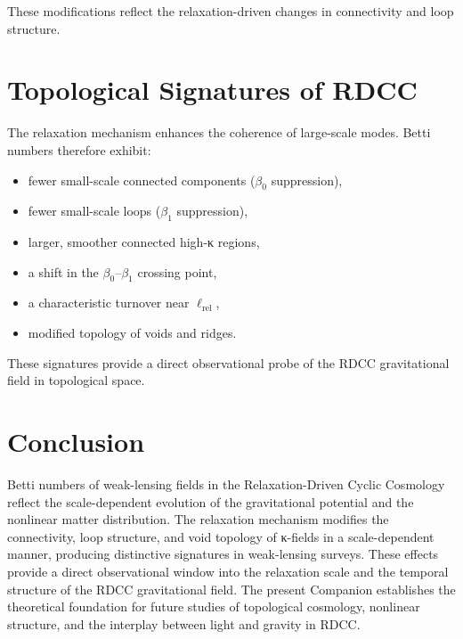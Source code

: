 \documentclass[11pt,a4paper]{article}
\begin{document}
These modifications reflect the relaxation-driven changes in connectivity and loop 
structure.
\section{Topological Signatures of RDCC}

The relaxation mechanism enhances the coherence of large-scale modes. Betti numbers 
therefore exhibit:

\begin{itemize}
    \item fewer small-scale connected components ($\beta_{0}$ suppression),
    \item fewer small-scale loops ($\beta_{1}$ suppression),
    \item larger, smoother connected high-κ regions,
    \item a shift in the $\beta_{0}$–$\beta_{1}$ crossing point,
    \item a characteristic turnover near $\ell_{\mathrm{rel}}$,
    \item modified topology of voids and ridges.
\end{itemize}

These signatures provide a direct observational probe of the RDCC gravitational 
field in topological space.
\section{Conclusion}

Betti numbers of weak-lensing fields in the Relaxation-Driven Cyclic Cosmology 
reflect the scale-dependent evolution of the gravitational potential and the 
nonlinear matter distribution. The relaxation mechanism modifies the connectivity, 
loop structure, and void topology of κ-fields in a scale-dependent manner, 
producing distinctive signatures in weak-lensing surveys. These effects provide a 
direct observational window into the relaxation scale and the temporal structure of 
the RDCC gravitational field. The present Companion establishes the theoretical 
foundation for future studies of topological cosmology, nonlinear structure, and 
the interplay between light and gravity in RDCC.


\nocite{*}

\end{document}
